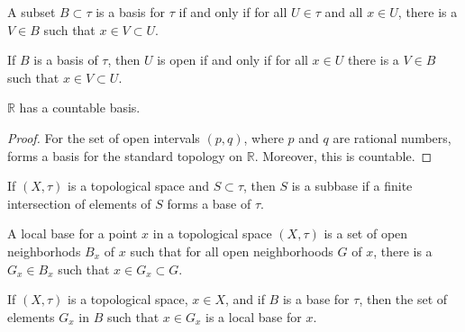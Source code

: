 \documentclass[crop=false,class=article,oneside]{standalone}
\begin{document}
        \begin{theorem}
            A subset $B\subset\tau$ is a basis
            for $\tau$ if and only if for all
            $U\in\tau$ and all $x\in{U}$, there is
            a $V\in{B}$ such that
            $x\in{V}\subset{U}$.
        \end{theorem}
        \begin{theorem}
            If $B$ is a basis of $\tau$, then
            $U$ is open if and only if for all
            $x\in{U}$ there is a $V\in{B}$ such that
            $x\in{V}\subset{U}$.
        \end{theorem}
        \begin{theorem}
            $\mathbb{R}$ has a countable basis.
        \end{theorem}
        \begin{proof}
            For the set of open intervals
            $(p,q)$, where $p$ and $q$ are rational
            numbers, forms a basis for the standard
            topology on $\mathbb{R}$. Moreover, this
            is countable.
        \end{proof}
        \begin{definition}
            If $(X,\tau)$ is a topological space
            and $S\subset\tau$, then $S$ is a subbase
            if a finite intersection of elements of $S$
            forms a base of $\tau$.
        \end{definition}
        \begin{definition}
            A local base for a point
            $x$ in a topological space $(X,\tau)$
            is a set of open neighborhods $B_{x}$ of
            $x$ such that for all open neighborhoods $G$
            of $x$, there is a $G_{x}\in{B_{x}}$ such that
            $x\in{G_{x}}\subset{G}$.
        \end{definition}
        \begin{theorem}
            If $(X,\tau)$ is a topological space, $x\in{X}$,
            and if $B$ is a base for $\tau$, then
            the set of elements $G_{x}$ in $B$ such that
            $x\in{G_{x}}$ is a local base for $x$.
        \end{theorem}
\end{document}
